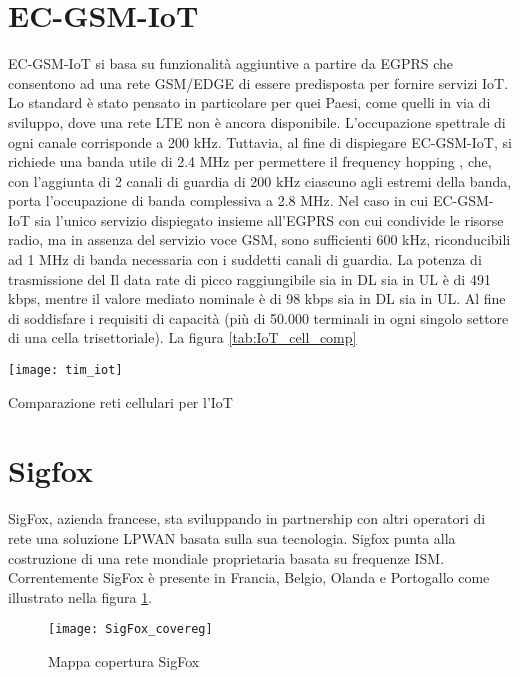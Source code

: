 \section{EC-GSM-IoT}
EC-GSM-IoT si basa su funzionalità aggiuntive a partire da EGPRS che consentono
ad una rete GSM/EDGE di essere predisposta per fornire servizi IoT. Lo standard
è stato pensato in particolare per quei Paesi, come quelli in via di sviluppo,
dove una rete LTE non è ancora disponibile. L’occupazione spettrale di ogni
canale corrisponde a  200 kHz.  Tuttavia, al fine di dispiegare EC-GSM-IoT, si
richiede una banda utile di 2.4 MHz per permettere il frequency hopping , che,
con l’aggiunta di 2 canali di guardia di 200 kHz ciascuno agli estremi della
banda, porta l’occupazione di banda complessiva a 2.8 MHz. Nel caso in cui
EC-GSM-IoT sia l’unico servizio dispiegato  insieme  all’EGPRS con cui condivide
le risorse radio, ma in assenza del servizio voce GSM, sono sufficienti 600 kHz,
riconducibili ad 1 MHz di banda necessaria con i suddetti canali di guardia. La
potenza di trasmissione del Il data rate di picco raggiungibile sia in DL sia in
UL è di 491 kbps, mentre il valore mediato nominale è di 98 kbps sia in DL sia
in UL. Al fine di soddisfare i requisiti di capacità (più di 50.000 terminali in
ogni singolo settore di una cella trisettoriale). La figura
\ref{tab:IoT_cell_comp}
\begin{table}[h]
    \centering 
                \texttt{[image: tim\_iot]}
    \caption{Comparazione reti cellulari per l'IoT}
    \label{tab:IoT_cell_comp} 
\end{table}



\section{Sigfox}
SigFox, azienda francese, sta sviluppando in partnership con altri operatori di
rete una soluzione LPWAN basata sulla sua tecnologia. Sigfox punta alla
costruzione di una rete mondiale proprietaria basata su frequenze ISM.
Correntemente SigFox è presente in Francia, Belgio, Olanda e Portogallo come
illustrato nella figura \ref{fig:Sig_covereg}.
\begin{figure}[h]
    \centering 
                \texttt{[image: SigFox\_covereg]}
    \caption{Mappa copertura SigFox}
    \label{fig:Sig_covereg} 
\end{figure}

